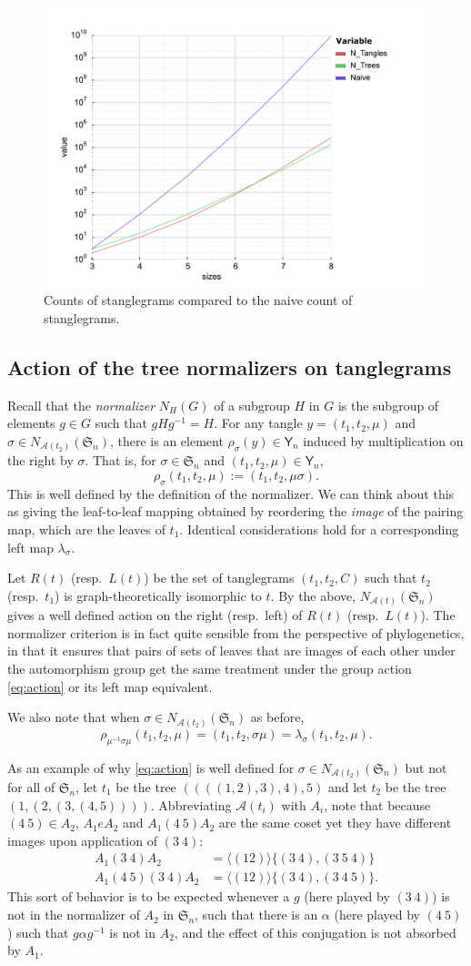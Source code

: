 \documentclass{amsart}
\newcommand{\fS}{\mathfrak S}
\newcommand{\aut}{\mathcal A}
\newcommand{\pairing}{\mu}
\newcommand{\tangle}{\mathsf{Y}}
\newcommand{\arxiv}[1]{#1}
\newcommand{\FIGcountSymm}{\
\label{FIGcountSymm}
\begin{figure}
  \arxiv{\includegraphics[width=.8\linewidth]{figures/symmetric-count}}
  \caption{Counts of stanglegrams compared to the naive count of stanglegrams.}
\end{figure}
}
\begin{document}
\FIGcountSymm

\subsection{Action of the tree normalizers on tanglegrams}
Recall that the \emph{normalizer} $N_H(G)$ of a subgroup $H$ in $G$ is the subgroup of elements $g \in G$ such that $gHg^{-1} = H$.
For any tangle $y = (t_1, t_2, \pairing)$ and $\sigma \in N_{\aut(t_2)}(\fS_n)$, there is an element $\rho_\sigma(y) \in \tangle_n$ induced by multiplication on the right by $\sigma$.
That is, for $\sigma \in \fS_n$ and $(t_1, t_2, \pairing) \in \tangle_n$,
\begin{equation}
\label{eq:action}
\rho_\sigma (t_1, t_2, \pairing) := (t_1, t_2, \pairing \sigma).
\end{equation}
This is well defined by the definition of the normalizer.
We can think about this as giving the leaf-to-leaf mapping obtained by reordering the \emph{image} of the pairing map, which are the leaves of $t_1$.
Identical considerations hold for a corresponding left map $\lambda_\sigma$.

Let $R(t)$ (resp.\ $L(t)$) be the set of tanglegrams $(t_1, t_2, C)$ such that $t_2$ (resp.\ $t_1$) is graph-theoretically isomorphic to $t$.
By the above, $N_{\aut(t)}(\fS_n)$ gives a well defined action on the right (resp.\ left) of $R(t)$ (resp.\ $L(t)$).
The normalizer criterion is in fact quite sensible from the perspective of phylogenetics, in that it ensures that pairs of sets of leaves that are images of each other under the automorphism group get the same treatment under the group action \eqref{eq:action} or its left map equivalent.

We also note that when $\sigma \in N_{\aut(t_2)}(\fS_n)$ as before,
\[
\rho_{\pairing^{-1} \sigma \pairing} (t_1, t_2, \pairing) =
(t_1, t_2, \sigma \pairing) =
\lambda_{\sigma} (t_1, t_2, \pairing).
\]

As an example of why \eqref{eq:action} is well defined for $\sigma \in N_{\aut(t_2)}(\fS_n)$ but not for all of $\fS_n$, let $t_1$ be the tree $((((1,2),3),4),5)$ and let $t_2$ be the tree $(1,(2,(3,(4,5))))$.
Abbreviating $\aut(t_i)$ with $A_i$, note that because $(4\ 5) \in A_2$, $A_1 e A_2$ and $A_1 (4\ 5) A_2$ are the same coset yet they have different images upon application of $(3\ 4)$:
\begin{align*}
A_1 (3\ 4) A_2 & = \langle (1 2) \rangle \{(3\ 4), (3\ 5\ 4)\} \\
A_1 (4\ 5) (3\ 4) A_2 & = \langle (1 2) \rangle \{(3\ 4), (3\ 4\ 5)\}.
\end{align*}
This sort of behavior is to be expected whenever a $g$ (here played by $(3\ 4)$) is not in the normalizer of $A_2$ in $\fS_n$, such that there is an $\alpha$ (here played by $(4\ 5)$) such that $g \alpha g^{-1}$ is not in $A_2$, and the effect of this conjugation is not absorbed by $A_1$.
\end{document}
